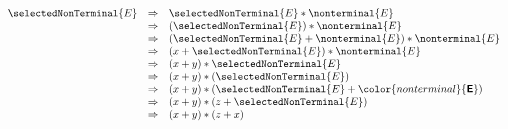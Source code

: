 

 \[
  \begin{array}{rcl}
    {\selectedNonTerminal{E}} &\Rightarrow& {\selectedNonTerminal{E} * \nonterminal{E}} \\
      &\Rightarrow& (\selectedNonTerminal{E}) * \nonterminal{E}\\
      &\Rightarrow& (\selectedNonTerminal{E} + \nonterminal{E}) * \nonterminal{E} \\
      &\Rightarrow& (x+ \selectedNonTerminal{E}) * \nonterminal{E}\\
      &\Rightarrow& (x+y)* \selectedNonTerminal{E}\\
      &\Rightarrow& (x+y)*( \selectedNonTerminal{E} )\\
      &\Rightarrow& (x+y)*(\selectedNonTerminal{E} +{\color{nonterminal}{\textbf{\textsf{E}}}})\\
      &\Rightarrow& (x+y)*(z+ \selectedNonTerminal{E})\\
      &\Rightarrow& (x+y)*(z+x)\\
  \end{array}
  \]